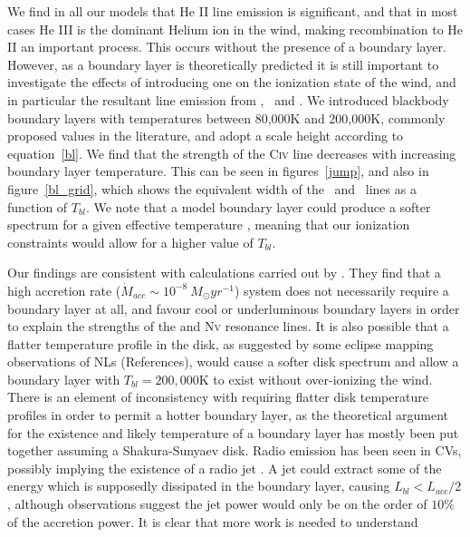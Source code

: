 \documentclass[preprint, a4paper, 11pt]{aastex}
\begin{document}
We find in all our models that He II line emission is significant, and that 
in most cases He  III is the dominant Helium ion in the wind, making recombination
to He II an important process. This occurs without the presence of a boundary 
layer. However, as a boundary layer is theoretically predicted 
it is still important to investigate the effects of introducing
one on the ionization state of the wind, and in particular
the resultant line emission from \heiiuv, \heiiopt\ and \civ. 
We introduced blackbody boundary layers with temperatures between 80,000K and 200,000K,
commonly proposed values in the literature, and adopt a scale height according to
equation~\ref{bl}. We find that the strength of the C\textsc{iv} line decreases
with increasing boundary layer temperature. This can be seen
in figures~\ref{jump}, and also in figure~\ref{bl_grid}, which
shows the equivalent width of the \civ\ and \heiiuv\ lines as 
a function of $T_{bl}$.
We note that a model boundary layer could produce a softer
spectrum for a given effective temperature \citep[e.g.][]{suleimanov2014}, 
meaning that our ionization constraints would
allow for a higher value of $T_{bl}$.



Our findings
are consistent with calculations carried out by
\cite{hoaredrew1993}. They find that a high accretion rate 
($\dot{M}_{acc} \sim 10^{-8}~M_{\odot}yr^{-1}$) 
system does not necessarily require a boundary layer at all,
and favour cool or underluminous boundary layers
in order to explain the strengths of the \civ and N\textsc{v} 
resonance lines.
It is also possible that a flatter temperature profile in the disk,
as suggested by some eclipse mapping observations of NLs (References),
would cause a softer disk spectrum and allow a boundary layer 
with $T_{bl} = 200,000$K to exist without over-ionizing the wind.
There is an element of inconsistency with 
requiring flatter disk temperature profiles in order to permit
a hotter boundary layer, as the theoretical argument 
for the existence and likely temperature of a boundary layer has 
mostly been put together assuming a Shakura-Sunyaev disk.  
Radio emission has been seen in CVs, possibly implying the 
existence of a radio jet \cite[see e.g.][]{kordingDNjet2008,kording2011}.
A jet could extract some of the energy which is supposedly dissipated in the 
boundary layer, causing $L_{bl} < L_{acc}/2$, although
observations suggest the jet power would only be on the order
of $10\%$ of the accretion power. 
It is clear that more work is needed to understand 
\end{document}
